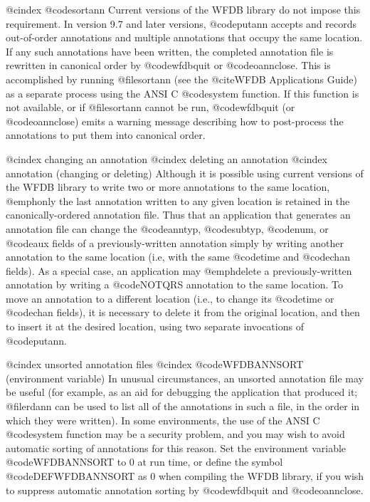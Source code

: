 {{{{{{{{{{@cindex @code{sortann}
Current versions of the WFDB library do not impose this requirement.  In version
9.7 and later versions, @code{putann} accepts and records out-of-order
annotations and multiple annotations that occupy the same location.  If any
such annotations have been written, the completed annotation file is rewritten
in canonical order by @code{wfdbquit} or @code{oannclose}.  This is accomplished
by running @file{sortann} (see the @cite{WFDB Applications
Guide}) as a separate process using the ANSI C @code{system} function.  If this
function is not available, or if @file{sortann} cannot be run, @code{wfdbquit}
(or @code{oannclose}) emits a warning message describing how to post-process
the annotations to put them into canonical order.

@cindex changing an annotation
@cindex deleting an annotation
@cindex annotation (changing or deleting)
Although it is possible using current versions of the WFDB library to write two
or more annotations to the same location, @emph{only the last annotation
written to any given location is retained} in the canonically-ordered
annotation file.  Thus that an application that generates an annotation file
can change the @code{anntyp}, @code{subtyp}, @code{num}, or @code{aux} fields
of a previously-written annotation simply by writing another annotation to the
same location (i.e, with the same @code{time} and @code{chan} fields).  As a
special case, an application may @emph{delete} a previously-written annotation
by writing a @code{NOTQRS} annotation to the same location.  To move an
annotation to a different location (i.e., to change its @code{time} or
@code{chan} fields), it is necessary to delete it from the original location,
and then to insert it at the desired location, using two separate invocations
of @code{putann}.

@cindex unsorted annotation files
@cindex @code{WFDBANNSORT} (environment variable)
In unusual circumstances, an unsorted annotation file may be useful (for
example, as an aid for debugging the application that produced it; @file{rdann}
can be used to list all of the annotations in such a file, in the order in
which they were written).  In some environments, the use of the ANSI C
@code{system} function may be a security problem, and you may wish to avoid
automatic sorting of annotations for this reason.  Set the environment variable
@code{WFDBANNSORT} to 0 at run time, or define the symbol @code{DEFWFDBANNSORT}
as 0 when compiling the WFDB library, if you wish to suppress automatic
annotation sorting by @code{wfdbquit} and @code{oannclose}.

}}}}}}}}}}
